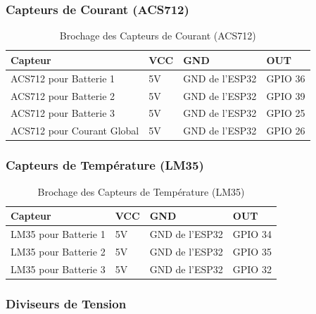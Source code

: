 \subsubsection*{Capteurs de Courant (ACS712)}

\begin{table}[H]
	\centering
	\caption{Brochage des Capteurs de Courant (ACS712)}
	\begin{tabular}{|p{5.5cm}|p{2cm}|p{3.5cm}|p{2.5cm}|}
		\hline
		\rule[0.5cm]{0cm}{0cm} \textbf{Capteur} & \textbf{VCC} & \textbf{GND} & \textbf{OUT} \\
		\hline
		\rule[0.5cm]{0cm}{0cm} ACS712 pour Batterie 1 & 5V & GND de l'ESP32 & GPIO 36 \\
		\hline
		\rule[0.5cm]{0cm}{0cm} ACS712 pour Batterie 2 & 5V & GND de l'ESP32 & GPIO 39 \\
		\hline
		\rule[0.5cm]{0cm}{0cm} ACS712 pour Batterie 3 & 5V & GND de l'ESP32 & GPIO 25 \\
		\hline
		\rule[0.5cm]{0cm}{0cm} ACS712 pour Courant Global & 5V & GND de l'ESP32 & GPIO 26 \\
		\hline
	\end{tabular}
\end{table}

\subsubsection*{Capteurs de Température (LM35)}

\begin{table}[H]
	\centering
	\caption{Brochage des Capteurs de Température (LM35)}
	\begin{tabular}{|p{4.5cm}|p{2cm}|p{3.5cm}|p{3.5cm}|}
		\hline
		\rule[0.5cm]{0cm}{0cm} \textbf{Capteur} & \textbf{VCC} & \textbf{GND} & \textbf{OUT} \\
		\hline
		\rule[0.5cm]{0cm}{0cm} LM35 pour Batterie 1 & 5V & GND de l'ESP32 & GPIO 34 \\
		\hline
		\rule[0.5cm]{0cm}{0cm} LM35 pour Batterie 2 & 5V & GND de l'ESP32 & GPIO 35 \\
		\hline
		\rule[0.5cm]{0cm}{0cm} LM35 pour Batterie 3 & 5V & GND de l'ESP32 & GPIO 32 \\
		\hline
	\end{tabular}
\end{table}

\subsubsection*{Diviseurs de Tension}

